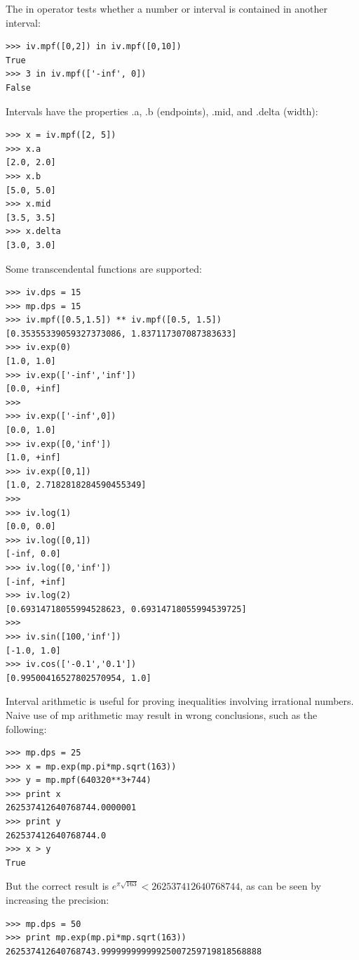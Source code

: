 The in operator tests whether a number or interval is contained in another interval:

\begin{lstlisting}
>>> iv.mpf([0,2]) in iv.mpf([0,10])
True
>>> 3 in iv.mpf(['-inf', 0])
False
\end{lstlisting}


Intervals have the properties .a, .b (endpoints), .mid, and .delta (width):

\begin{lstlisting}
>>> x = iv.mpf([2, 5])
>>> x.a
[2.0, 2.0]
>>> x.b
[5.0, 5.0]
>>> x.mid
[3.5, 3.5]
>>> x.delta
[3.0, 3.0]
\end{lstlisting}


Some transcendental functions are supported:

\begin{lstlisting}
>>> iv.dps = 15
>>> mp.dps = 15
>>> iv.mpf([0.5,1.5]) ** iv.mpf([0.5, 1.5])
[0.35355339059327373086, 1.837117307087383633]
>>> iv.exp(0)
[1.0, 1.0]
>>> iv.exp(['-inf','inf'])
[0.0, +inf]
>>>
>>> iv.exp(['-inf',0])
[0.0, 1.0]
>>> iv.exp([0,'inf'])
[1.0, +inf]
>>> iv.exp([0,1])
[1.0, 2.7182818284590455349]
>>>
>>> iv.log(1)
[0.0, 0.0]
>>> iv.log([0,1])
[-inf, 0.0]
>>> iv.log([0,'inf'])
[-inf, +inf]
>>> iv.log(2)
[0.69314718055994528623, 0.69314718055994539725]
>>>
>>> iv.sin([100,'inf'])
[-1.0, 1.0]
>>> iv.cos(['-0.1','0.1'])
[0.99500416527802570954, 1.0]
\end{lstlisting}


Interval arithmetic is useful for proving inequalities involving irrational numbers. Naive use of mp arithmetic may result in wrong conclusions, such as the following:

\begin{lstlisting}
>>> mp.dps = 25
>>> x = mp.exp(mp.pi*mp.sqrt(163))
>>> y = mp.mpf(640320**3+744)
>>> print x
262537412640768744.0000001
>>> print y
262537412640768744.0
>>> x > y
True
\end{lstlisting}


But the correct result is $e^{\pi\sqrt{163}} < 262537412640768744$, as can be seen by increasing the precision:

\begin{lstlisting}
>>> mp.dps = 50
>>> print mp.exp(mp.pi*mp.sqrt(163))
262537412640768743.99999999999925007259719818568888
\end{lstlisting}


